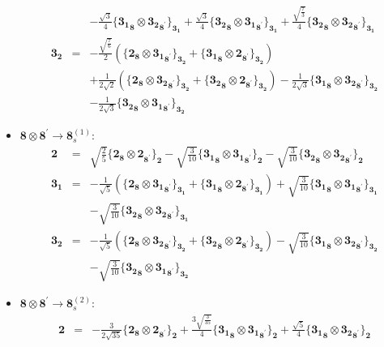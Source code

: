 \documentclass[english]{article}
\newcommand{\subcg}[3]{\big\{ {#1}\otimes{#2}\big\}^{}_{#3}}
\newcommand{\rep}[1]{\mathbf{#1}}
\begin{document}
\begin{itemize}
\begin{eqnarray*}
 & & -\frac{\sqrt{3}}{4}\subcg{\rep{3_1}_{\rep{8}}}{\rep{3_2}_{\rep{8}^{\prime}}}{\rep{3_1}}+\frac{\sqrt{3}}{4}\subcg{\rep{3_2}_{\rep{8}}}{\rep{3_1}_{\rep{8}^{\prime}}}{\rep{3_1}}+\frac{\sqrt{\frac{7}{3}}}{4}\subcg{\rep{3_2}_{\rep{8}}}{\rep{3_2}_{\rep{8}^{\prime}}}{\rep{3_1}}
\\
\rep{3_2} &=& -\frac{\sqrt{\frac{7}{6}}}{2}\left(\subcg{\rep{2}_{\rep{8}}}{\rep{3_1}_{\rep{8}^{\prime}}}{\rep{3_2}}+\subcg{\rep{3_1}_{\rep{8}}}{\rep{2}_{\rep{8}^{\prime}}}{\rep{3_2}}\right) \\ 
 & & +\frac{1}{2 \sqrt{2}}\left(\subcg{\rep{2}_{\rep{8}}}{\rep{3_2}_{\rep{8}^{\prime}}}{\rep{3_2}}+\subcg{\rep{3_2}_{\rep{8}}}{\rep{2}_{\rep{8}^{\prime}}}{\rep{3_2}}\right)-\frac{1}{2 \sqrt{3}}\subcg{\rep{3_1}_{\rep{8}}}{\rep{3_2}_{\rep{8}^{\prime}}}{\rep{3_2}} \\ 
 & & -\frac{1}{2 \sqrt{3}}\subcg{\rep{3_2}_{\rep{8}}}{\rep{3_1}_{\rep{8}^{\prime}}}{\rep{3_2}}
\end{eqnarray*}
\item $\rep{8}\otimes\rep{8}^{\prime}\to\rep{8}_{s}^{(1)}$:
\begin{eqnarray*}
\rep{2} &=& \sqrt{\frac{2}{5}}\subcg{\rep{2}_{\rep{8}}}{\rep{2}_{\rep{8}^{\prime}}}{\rep{2}}-\sqrt{\frac{3}{10}}\subcg{\rep{3_1}_{\rep{8}}}{\rep{3_1}_{\rep{8}^{\prime}}}{\rep{2}}-\sqrt{\frac{3}{10}}\subcg{\rep{3_2}_{\rep{8}}}{\rep{3_2}_{\rep{8}^{\prime}}}{\rep{2}}
\\
\rep{3_1} &=& -\frac{1}{\sqrt{5}}\left(\subcg{\rep{2}_{\rep{8}}}{\rep{3_1}_{\rep{8}^{\prime}}}{\rep{3_1}}+\subcg{\rep{3_1}_{\rep{8}}}{\rep{2}_{\rep{8}^{\prime}}}{\rep{3_1}}\right)+\sqrt{\frac{3}{10}}\subcg{\rep{3_1}_{\rep{8}}}{\rep{3_1}_{\rep{8}^{\prime}}}{\rep{3_1}} \\ 
 & & -\sqrt{\frac{3}{10}}\subcg{\rep{3_2}_{\rep{8}}}{\rep{3_2}_{\rep{8}^{\prime}}}{\rep{3_1}}
\\
\rep{3_2} &=& -\frac{1}{\sqrt{5}}\left(\subcg{\rep{2}_{\rep{8}}}{\rep{3_2}_{\rep{8}^{\prime}}}{\rep{3_2}}+\subcg{\rep{3_2}_{\rep{8}}}{\rep{2}_{\rep{8}^{\prime}}}{\rep{3_2}}\right)-\sqrt{\frac{3}{10}}\subcg{\rep{3_1}_{\rep{8}}}{\rep{3_2}_{\rep{8}^{\prime}}}{\rep{3_2}} \\ 
 & & -\sqrt{\frac{3}{10}}\subcg{\rep{3_2}_{\rep{8}}}{\rep{3_1}_{\rep{8}^{\prime}}}{\rep{3_2}}
\end{eqnarray*}
\item $\rep{8}\otimes\rep{8}^{\prime}\to\rep{8}_{s}^{(2)}$:
\begin{eqnarray*}
\rep{2} &=& -\frac{3}{2 \sqrt{35}}\subcg{\rep{2}_{\rep{8}}}{\rep{2}_{\rep{8}^{\prime}}}{\rep{2}}+\frac{3 \sqrt{\frac{3}{35}}}{4}\subcg{\rep{3_1}_{\rep{8}}}{\rep{3_1}_{\rep{8}^{\prime}}}{\rep{2}}+\frac{\sqrt{5}}{4}\subcg{\rep{3_1}_{\rep{8}}}{\rep{3_2}_{\rep{8}^{\prime}}}{\rep{2}} \\ 

\end{eqnarray*}
\end{itemize}
\end{document}
